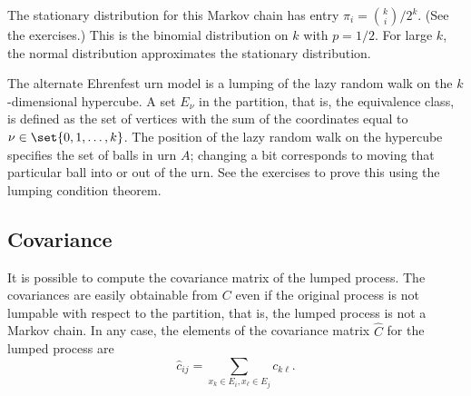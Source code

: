 \documentclass[12pt]{article}
\begin{document}
\begin{example}
    The stationary distribution for this Markov chain has entry \( \pi_i
    = \binom{k}{i}/2^k \).  (See the exercises.) This is the binomial
    distribution on \( k \) with \( p = 1/2 \).  For large \( k \), the
    normal distribution approximates the stationary distribution.

    The alternate Ehrenfest urn model is a lumping of the lazy random
    walk on the \( k \)-dimensional hypercube.  A set \( E_{\nu} \) in
    the partition, that is, the equivalence class, is defined as the set
    of vertices with the sum of the coordinates equal to \( \nu \in \set
    {0,1,\dots, k} \).  The position of the lazy random walk on the
    hypercube specifies the set of balls in urn \( A \); changing a bit
    corresponds to moving that particular ball into or out of the urn.
    See the exercises to prove this using the lumping condition theorem.

\end{example}

\subsection*{Covariance}

It is possible to compute the covariance matrix of the lumped process.
The covariances are easily obtainable from \( C \) even if the original
process is not lumpable with respect to the partition, that is, the
lumped process is not a Markov chain.  In any case, the elements of the
covariance matrix \( \hat{C} \) for the lumped process are
\[
    \hat{c}_{ij} = \sum_{x_k \in E_i, x_{\ell} \in E_j } c_{k \ell}.
\]
\end{document}
